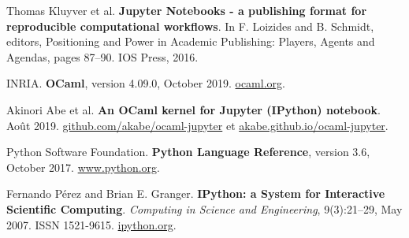 \documentclass[runningheads]{llncs}
\begin{document}
%
%
% 
% 
%
\begin{thebibliography}{8}
    Thomas Kluyver et al.
    \textbf{Jupyter Notebooks - a publishing format for reproducible computational workflows}.
    In F. Loizides and B. Schmidt, editors, Positioning and Power in Academic Publishing: Players, Agents and Agendas, pages 87–90. IOS Press, 2016.

    INRIA.
    \textbf{OCaml}, version 4.09.0, October 2019. \url{ocaml.org}.

    Akinori Abe et al.
    \textbf{An OCaml kernel for Jupyter (IPython) notebook}.
    Août 2019. \url{github.com/akabe/ocaml-jupyter} et \url{akabe.github.io/ocaml-jupyter}.

    Python Software Foundation.
    \textbf{Python Language Reference}, version 3.6, October 2017. \url{www.python.org}.

    Fernando Pérez and Brian E. Granger.
    \textbf{IPython: a System for Interactive Scientific Computing}.
    \emph{Computing in Science and Engineering}, 9(3):21–29, May 2007. ISSN 1521-9615. \url{ipython.org}.
\end{thebibliography}
\end{document}
